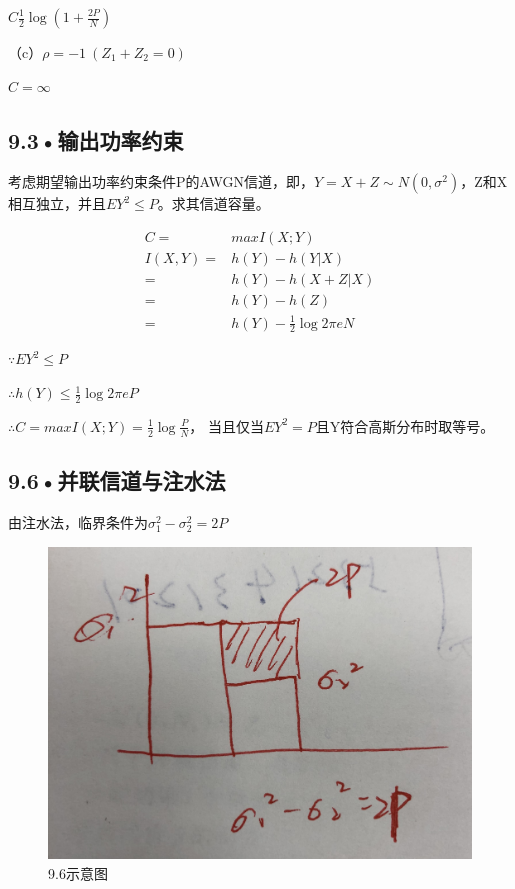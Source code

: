 \documentclass[UTF8]{ctexart}
\begin{document}
$C \frac{1}{2}\log(1+\frac{2P}{N})$


（c）$\rho =-1\ (Z_1+Z_2 = 0)$

$ C = \infty$

\subsection*{9.3•输出功率约束}
考虑期望输出功率约束条件P的AWGN信道，即，$Y=X+Z\sim N(0,\sigma ^2)$，Z和X相互独立，并且$EY^2\leqslant P$。求其信道容量。

\begin{equation*}
    \begin{split}
        C =& max I(X;Y)\\
        I(X,Y)=& h(Y) - h(Y|X)\\
        =& h(Y) - h(X+Z|X)\\
        =& h(Y)-h(Z)\\
        =& h(Y)- \frac{1}{2}\log 2\pi e N
    \end{split}
\end{equation*}

$\because EY^2\leqslant P$

$\therefore h(Y)\leqslant \frac{1}{2}\log 2\pi e P$

$\therefore C = max I(X;Y)= \frac{1}{2}\log \frac{P}{N}$， 当且仅当$EY^2= P$且Y符合高斯分布时取等号。
\subsection*{9.6•并联信道与注水法}
由注水法，临界条件为$\sigma_1^2-\sigma_2^2=2P$

\begin{figure}[h]
    \centerline{\includegraphics[totalheight = 1.5in]{ch9-6.jpg}}
    \caption{9.6示意图}
    \end{figure}
\end{document}
